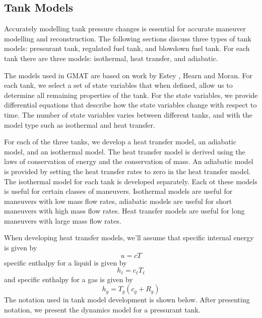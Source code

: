 

\subsection{Tank Models}

Accurately modelling tank pressure changes is essential for accurate
maneuver modelling and reconstruction.  The following sections
discuss three types of tank models:  pressurant tank, regulated fuel
tank, and blowdown fuel tank.  For each tank there are three models:
isothermal, heat transfer, and adiabatic.

The models used in GMAT are based on work by Estey\cite{Estey:83} ,
Hearn\cite{Hearn:01} and Moran\cite{Moran}.  For each tank, we
select a set of state variables that when defined, allow us to
determine all remaining properties of the tank.  For the state
variables, we provide differential equations that describe how the
state variables change with respect to time.  The number of state
variables varies between different tanks, and with the model type
such as isothermal and heat transfer.

For each of the three tanks, we develop a heat transfer model, an
adiabatic model, and an isothermal model.  The heat transfer model
is derived using the laws of conservation of energy and the
conservation of mass. An adiabatic model is provided by setting the
heat transfer rates to zero in the heat transfer model. The
isothermal model for each tank is developed separately. Each ot
these models is useful for certain classes of maneuvers.  Isothermal
models are useful for maneuvers with low mass flow rates, adiabatic
models are useful for short maneuvers with high mass flow rates.
Heat transfer models are useful for long maneuvers with large mass
flow rates.

When developing heat transfer models, we'll assume that specific
internal energy is given by
%
\begin{equation}
    u = c T
\end{equation}
%
specific enthalpy for a liquid is given by
%
\begin{equation}
    h_\ell = c_\ell T_\ell
\end{equation}
%
and specific enthalpy  for a gas is given by
%
\begin{equation}
    h_g = T_g( c_g + R_g)
\end{equation}
%
The notation used in tank model development is shown below.  After
presenting notation, we present the dynamics model for a pressurant
tank.

